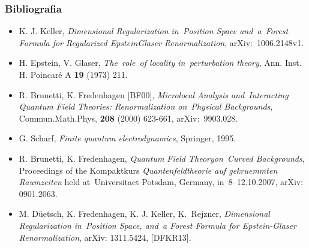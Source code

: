 \documentclass[10pt,t]{beamer}
\begin{document}
\begin{frame}
  \frametitle{Bibliografia}


  \begin{itemize}
    \RaggedRight

  \item K. J. Keller, \textit{Dimensional Regularization in~Position
      Space and~a~Forest Formula for Regularized Epstein\dywiz Glaser
      Renormalization}, arXiv:~1006.2148v1.

  \item H. Epstein, V. Glaser, \textit{The~role~of locality
      in~perturbation theory}, Ann. Inst. H. Poincar\'{e} A
    \textbf{19} (1973) 211.

  \item R. Brunetti, K. Fredenhagen [BF00], \textit{Microlocal
      Analysis and~Interacting Quantum Field Theories: Renormalization
      on~Physical Backgrounds}, Commun.Math.Phys, \textbf{208} (2000)
    623-661, arXiv:~9903.028.

  \item G. Scharf, \textit{Finite quantum electrodynamics}, Springer,
    1995.

  \item R. Brunetti, K. Fredenhagen, \textit{Quantum Field
      Theory\linebreak on~Curved Backgrounds}, Proceedings of the
    Kompaktkurs \emph{Quantenfeldtheorie auf gekruemmten
      Raumzeiten}
    held at~Universitaet Potsdam, Germany, in~8--12.10.2007,
    arXiv:
    0901.2063.

  \item M. D\"{u}etsch, K. Fredenhagen, K. J.
    Keller, K.~Rejzner, \textit{Dimensional Regularization in~Position
      Space, and~a Forest Formula for Epstein-Glaser Renormalization},
    arXiv: 1311.5424, [DFKR13].

  \end{itemize}

\end{frame}












{}






\end{document}
